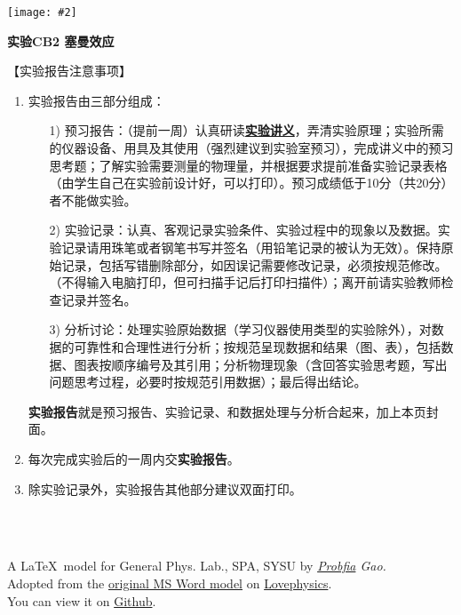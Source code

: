 \documentclass[11pt,a4paper]{ctexart}
\newcommand{\ExpeName}{实验CB2 塞曼效应}
\newcommand{\cpic}[2]{
\begin{center}
\texttt{[image: \#2]}
\end{center}
}
\begin{document}
\cpic{0.255}{e1}%
\begin{center}
\LARGE\textbf{{\ExpeName}}
\end{center}
\large{【实验报告注意事项】}
\begin{enumerate}
 \item 实验报告由三部分组成：
 \begin{enumerate}
  \item[1)]预习报告：（提前一周）认真研读\textbf{\uline{实验讲义}}，弄清实验原理；实验所需的仪器设备、用具及其使用（强烈建议到实验室预习），完成讲义中的预习思考题；了解实验需要测量的物理量，并根据要求提前准备实验记录表格（由学生自己在实验前设计好，可以打印）。预习成绩低于10分（共20分）者不能做实验。
  \item[2)]实验记录：认真、客观记录实验条件、实验过程中的现象以及数据。实验记录请用珠笔或者钢笔书写并签名（{\color{red}用铅笔记录的被认为无效}）。{\color{red}保持原始记录，包括写错删除部分，如因误记需要修改记录，必须按规范修改。}（不得输入电脑打印，但可扫描手记后打印扫描件）；离开前请实验教师检查记录并签名。
  \item[3)]分析讨论：处理实验原始数据（学习仪器使用类型的实验除外），对数据的可靠性和合理性进行分析；按规范呈现数据和结果（图、表），包括数据、图表按顺序编号及其引用；分析物理现象（含回答实验思考题，写出问题思考过程，必要时按规范引用数据）；最后得出结论。
 \end{enumerate}
 \textbf{实验报告}就是预习报告、实验记录、和数据处理与分析合起来，加上本页封面。
 \item 每次完成实验后的一周内交\textbf{实验报告}。
 \item 除实验记录外，实验报告其他部分建议双面打印。
\end{enumerate}
\ 
\\
\ 

\begin{flushright}                                                           %
\tiny{
A \LaTeX \ model for General Phys. Lab., SPA, SYSU by {\em \href{https://www.weibo.com/3532532974/profile?rightmod=1&wvr=6&mod=personinfo&is_all=1}{Probfia} Gao.}\\ Adopted from the \href{http://lovephysics.sysu.edu.cn/lib/exe/fetch.php?media=courses:secondlevelzhuhai:report.docx}{original MS Word model} on \href{http://lovephysics.sysu.edu.cn}{Lovephysics}.\\ You can view it on \href{https://github.com/Probfia/SYSU_GPL_C}{Github}.}
\end{flushright}
\end{document}
